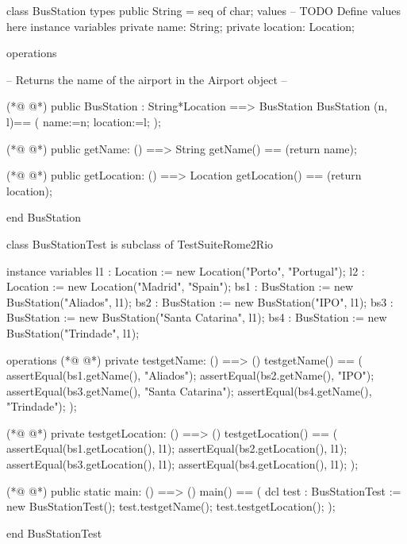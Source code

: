 \begin{vdmpp}[breaklines=true]
class BusStation 
types
public String = seq of char;
values
-- TODO Define values here
instance variables
private name: String;
private location: Location;

operations

-- Returns the name of the airport in the Airport object --

(*@
\label{BusStation:14}
@*)
public BusStation : String*Location ==> BusStation
BusStation (n, l)== (
 name:=n;
 location:=l;
 );
 
(*@
\label{getName:20}
@*)
public getName: () ==> String
getName() == (return name);

(*@
\label{getLocation:23}
@*)
public getLocation: () ==> Location
 getLocation() == (return location);

end BusStation

class BusStationTest is subclass of TestSuiteRome2Rio

 instance variables
 l1 :  Location := new Location("Porto", "Portugal");
 l2 : Location := new Location("Madrid", "Spain");
 bs1 : BusStation := new BusStation("Aliados", l1);
 bs2 : BusStation := new BusStation("IPO", l1);
 bs3 : BusStation := new BusStation("Santa Catarina", l1);
 bs4 : BusStation := new BusStation("Trindade", l1);
 
 operations
(*@
\label{testgetName:39}
@*)
  private testgetName: () ==> ()
   testgetName() == (
    assertEqual(bs1.getName(), "Aliados");
    assertEqual(bs2.getName(), "IPO");
    assertEqual(bs3.getName(), "Santa Catarina");
    assertEqual(bs4.getName(), "Trindade");
   );
   
(*@
\label{testgetLocation:47}
@*)
   private testgetLocation: () ==> ()
   testgetLocation() == (
    assertEqual(bs1.getLocation(), l1);
    assertEqual(bs2.getLocation(), l1);
    assertEqual(bs3.getLocation(), l1);
    assertEqual(bs4.getLocation(), l1);
   );
   
   
(*@
\label{main:56}
@*)
 public static main: () ==> ()
      main() ==
      (
       dcl test : BusStationTest := new BusStationTest();
       test.testgetName();
       test.testgetLocation();
       );
       
end BusStationTest
\end{vdmpp}
